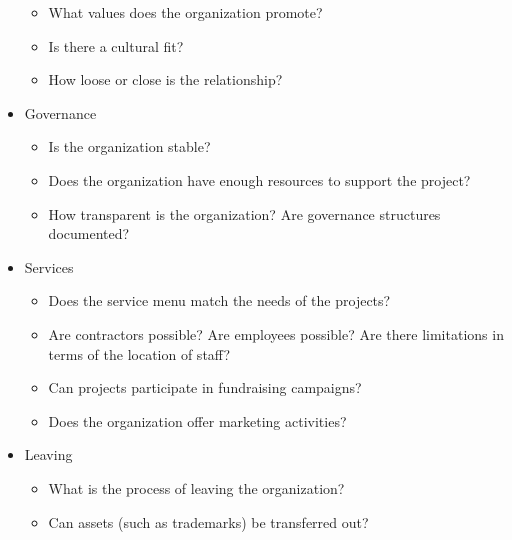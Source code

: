 \begin{itemize}
\begin{itemize}
\item What values does the organization promote?

\item Is there a cultural fit?

\item How loose or close is the relationship?

\end{itemize}

\item Governance

\begin{itemize}

\item Is the organization stable?

\item Does the organization have enough resources to support the project?

\item How transparent is the organization?  Are governance structures documented?

\end{itemize}

\item Services

\begin{itemize}

\item Does the service menu match the needs of the projects?

\item Are contractors possible?  Are employees possible?  Are there limitations in terms of the location of staff?

\item Can projects participate in fundraising campaigns?

\item Does the organization offer marketing activities?

\end{itemize}

\item Leaving

\begin{itemize}

\item What is the process of leaving the organization?

\item Can assets (such as trademarks) be transferred out?

\end{itemize}

\end{itemize}

